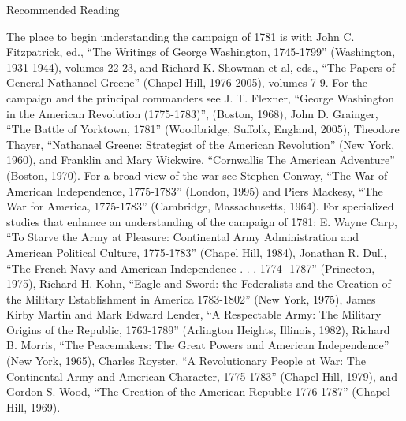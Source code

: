 Recommended Reading

The place to begin understanding the campaign of 1781 is with John C. Fitzpatrick,
ed., ``The Writings of George Washington, 1745-1799'' (Washington, 1931-1944), volumes
22-23, and Richard K. Showman et al, eds., ``The Papers of General Nathanael Greene''
(Chapel Hill, 1976-2005), volumes 7-9. For the campaign and the principal commanders
see J. T. Flexner, ``George Washington in the American Revolution (1775-1783)'', (Boston,
1968), John D. Grainger, “The Battle of Yorktown, 1781'' (Woodbridge, Suffolk, England,
2005), Theodore Thayer, ``Nathanael Greene: Strategist of the American Revolution'' (New
York, 1960), and Franklin and Mary Wickwire, ``Cornwallis The American Adventure''
(Boston, 1970). For a broad view of the war see Stephen Conway, ``The War of American
Independence, 1775-1783'' (London, 1995) and Piers Mackesy, ``The War for America,
1775-1783'' (Cambridge, Massachusetts, 1964). For specialized studies that enhance an
understanding of the campaign of 1781: E. Wayne Carp, ``To Starve the Army at Pleasure:
Continental Army Administration and American Political Culture, 1775-1783'' (Chapel
Hill, 1984), Jonathan R. Dull, ``The French Navy and American Independence . . . 1774-
1787'' (Princeton, 1975), Richard H. Kohn, ``Eagle and Sword: the Federalists and the
Creation of the Military Establishment in America 1783-1802'' (New York, 1975), James
Kirby Martin and Mark Edward Lender, ``A Respectable Army: The Military Origins of
the Republic, 1763-1789'' (Arlington Heights, Illinois, 1982), Richard B. Morris, ``The
Peacemakers: The Great Powers and American Independence'' (New York, 1965), Charles
Royster, ``A Revolutionary People at War: The Continental Army and American Character,
1775-1783'' (Chapel Hill, 1979), and Gordon S. Wood, ``The Creation of the American
Republic 1776-1787'' (Chapel Hill, 1969).
